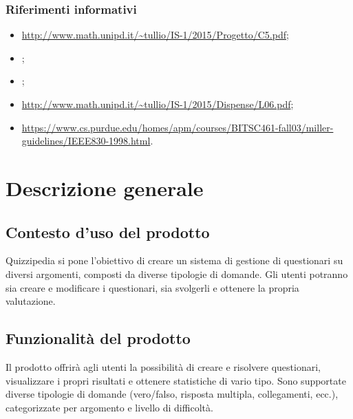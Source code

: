 \documentclass[a4paper, titlepage]{article}
\begin{document}
\subsubsection{Riferimenti informativi}
\begin{itemize}
\item {} 
\newline \url{http://www.math.unipd.it/~tullio/IS-1/2015/Progetto/C5.pdf};

\item {} \SdFdoc;

\item {} \Gldoc;

\item {}  \newline \url{http://www.math.unipd.it/~tullio/IS-1/2015/Dispense/L06.pdf};

\item {}  \newline \url{https://www.cs.purdue.edu/homes/apm/courses/BITSC461-fall03/miller-guidelines/IEEE830-1998.html}.

\end{itemize}

\newpage

\section{Descrizione generale}
\subsection{Contesto d'uso del prodotto}
Quizzipedia si pone l'obiettivo di creare un sistema di gestione di questionari su diversi argomenti, composti da diverse tipologie di domande. Gli utenti potranno sia creare e modificare i questionari, sia svolgerli e ottenere la propria valutazione.

\subsection{Funzionalità del prodotto}
Il prodotto offrirà agli utenti la possibilità di creare e risolvere questionari, visualizzare i propri risultati e ottenere statistiche di vario tipo. 
Sono supportate diverse tipologie di domande (vero/falso, risposta multipla, collegamenti, ecc.), categorizzate per argomento e livello di difficoltà. 
\end{document}
